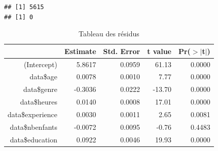 \documentclass[a4paper, french, 11 pt]{article}\usepackage[]{graphicx}\usepackage[]{xcolor}
\makeatletter
\newenvironment{kframe}{%
 \def\at@end@of@kframe{}%
 \ifinner\ifhmode%
  \def\at@end@of@kframe{\end{minipage}}%
  \begin{minipage}{\columnwidth}%
 \fi\fi%
 \def\FrameCommand##1{\hskip\@totalleftmargin \hskip-\fboxsep
 \colorbox{shadecolor}{##1}\hskip-\fboxsep
     \hskip-\linewidth \hskip-\@totalleftmargin \hskip\columnwidth}%
 \MakeFramed {\advance\hsize-\width
   \@totalleftmargin\z@ \linewidth\hsize
   \@setminipage}}%
 {\par\unskip\endMakeFramed%
 \at@end@of@kframe}
\newenvironment{knitrout}{}{} %
\makeatother
\begin{document}
\begin{knitrout}
\color{fgcolor}\begin{kframe}
\begin{verbatim}
## [1] 5615
## [1] 0
\end{verbatim}
\end{kframe}
\end{knitrout}

\begin{table}[ht]
\centering
\caption{Tableau des résidus} 
\label{tb:lm1}
\begin{tabular}{rrrrr}
  \toprule
 & Estimate & Std. Error & t value & Pr($>$$|$t$|$) \\ 
  \midrule
(Intercept) & 5.8617 & 0.0959 & 61.13 & 0.0000 \\ 
  data\$age & 0.0078 & 0.0010 & 7.77 & 0.0000 \\ 
  data\$genre & -0.3036 & 0.0222 & -13.70 & 0.0000 \\ 
  data\$heures & 0.0140 & 0.0008 & 17.01 & 0.0000 \\ 
  data\$experience & 0.0030 & 0.0011 & 2.65 & 0.0081 \\ 
  data\$nbenfants & -0.0072 & 0.0095 & -0.76 & 0.4483 \\ 
  data\$education & 0.0922 & 0.0046 & 19.93 & 0.0000 \\ 
   \bottomrule
\end{tabular}
\end{table}


\printbibliography
\end{document}
